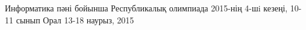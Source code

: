 \documentclass [11pt, a4paper, oneside] {article}
\begin{document}
\contest
{Информатика пәні бойынша Республикалық олимпиада 2015-нің 4-шi кезеңі, 10-11 сынып}%
{Орал}%
{13-18 наурыз, 2015}%


\renewcommand{\t}{\texttt}
\end{document}
